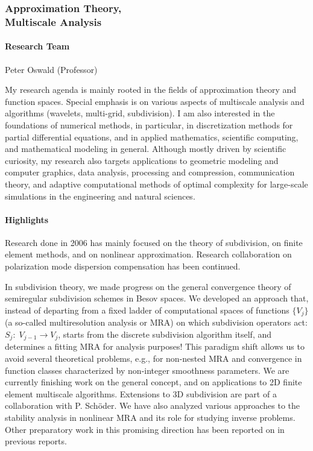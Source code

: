 
\subsubsection[Approximation Theory, Multiscale Analysis]{Approximation Theory,\\ Multiscale Analysis}

\paragraph{Research Team}
Peter Oswald (Professor)

\medskip

My research agenda is mainly rooted in the fields of approximation theory and
function spaces.  Special emphasis is on various aspects of multiscale analysis
and algorithms  (wavelets, multi-grid, subdivision). I am also interested in
the foundations of numerical methods, in particular, in discretization methods
for partial differential equations, and in applied mathematics, scientific
computing, and mathematical modeling  in general. Although mostly driven by
scientific curiosity, my research also targets applications to geometric
modeling and computer graphics, data analysis, processing and compression,
communication theory, and adaptive computational methods of optimal complexity
for large-scale simulations in the engineering and  natural sciences.


\paragraph{Highlights}
Research done in 2006 has mainly focused on the theory of subdivision, 
on finite element methods, and on nonlinear approximation. 
Research collaboration on polarization mode dispersion compensation has been continued.

In subdivision theory, we made progress on the general convergence theory of
semiregular subdivision schemes in Besov spaces. We developed an approach that, 
instead of departing from a fixed
ladder of computational spaces of functions $\{V_j\}$
(a so-called multiresolution analysis or MRA) 
on which subdivision operators act: $S_j:\;V_{j-1}\to V_j$, 
starts from the discrete subdivision algorithm itself, and determines a fitting
MRA for analysis purposes! This paradigm shift allows us to avoid several theoretical problems, e.g.,
for non-nested MRA and convergence in function classes characterized by non-integer
smoothness parameters.
We are currently finishing work on the general concept, and
on applications to 2D finite element multiscale algorithms.
Extensions to 3D subdivision are part of a collaboration with P. Sch\"oder.
We have also analyzed various approaches to the stability analysis in nonlinear MRA
and its role for studying inverse problems. Other preparatory work
in this promising direction has been reported on in previous reports.

